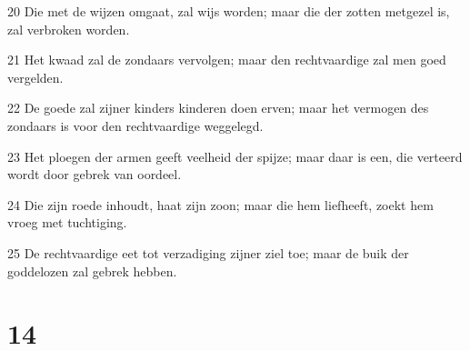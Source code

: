 \par 20 Die met de wijzen omgaat, zal wijs worden; maar die der zotten metgezel is, zal verbroken worden.
\par 21 Het kwaad zal de zondaars vervolgen; maar den rechtvaardige zal men goed vergelden.
\par 22 De goede zal zijner kinders kinderen doen erven; maar het vermogen des zondaars is voor den rechtvaardige weggelegd.
\par 23 Het ploegen der armen geeft veelheid der spijze; maar daar is een, die verteerd wordt door gebrek van oordeel.
\par 24 Die zijn roede inhoudt, haat zijn zoon; maar die hem liefheeft, zoekt hem vroeg met tuchtiging.
\par 25 De rechtvaardige eet tot verzadiging zijner ziel toe; maar de buik der goddelozen zal gebrek hebben.

\chapter{14}

